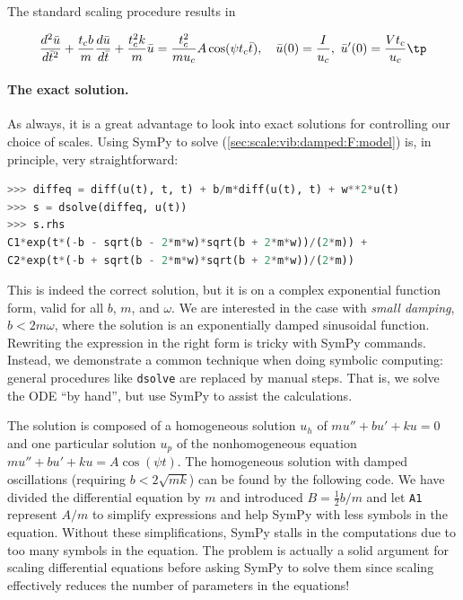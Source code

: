 \documentclass[graybox,envcountchap,sectrefs,final]{svmonodo}
\begin{document}
The standard scaling procedure results in

\begin{equation}
\frac{d^2\bar u}{d\bar t^2} + \frac{t_c b}{m}\frac{d\bar u}{d\bar t}
+ \frac{t_c^2 k}{m}\bar u =
\frac{t_c^2}{mu_c}A\cos(\psi t_c\bar t),
\quad \bar u(0)=\frac{I}{u_c},\ \bar u'(0)=\frac{Vt_c}{u_c}\tp
\label{sec:scale:vib:damped:F:model:scaled0}
\end{equation}

\paragraph{The exact solution.}
As always, it is
a great advantage to look into exact solutions for controlling our
choice of scales.
Using SymPy to solve (\ref{sec:scale:vib:damped:F:model}) is, in principle,
very straightforward:

\begin{lstlisting}[language=Python,style=graycolor]
>>> diffeq = diff(u(t), t, t) + b/m*diff(u(t), t) + w**2*u(t)
>>> s = dsolve(diffeq, u(t))
>>> s.rhs
C1*exp(t*(-b - sqrt(b - 2*m*w)*sqrt(b + 2*m*w))/(2*m)) +
C2*exp(t*(-b + sqrt(b - 2*m*w)*sqrt(b + 2*m*w))/(2*m))
\end{lstlisting}
This is indeed the correct solution, but it is on a complex
exponential function form, valid for all $b$, $m$, and $\omega$. We are
interested in the case with \emph{small damping}, $b < 2m\omega$, where the solution
is an exponentially damped sinusoidal function. Rewriting the expression
in the right form is tricky with SymPy commands. Instead, we demonstrate
a common technique when doing symbolic computing: general procedures like
\texttt{dsolve} are replaced by manual steps. That is, we solve the ODE ``by hand'',
but use SymPy to assist the calculations.

The solution is composed of a homogeneous
solution $u_h$ of $mu'' + bu' + ku=0$ and one particular solution $u_p$
of the nonhomogeneous equation
$mu'' + bu' + ku=A\cos(\psi t)$. The homogeneous solution with
damped oscillations (requiring $b < 2\sqrt{mk}$) can be
found by the following code. We have divided the differential equation
by $m$ and introduced $B=\frac{1}{2}b/m$ and let \texttt{A1} represent
$A/m$ to simplify expressions and
help SymPy with less symbols in the equation. Without these simplifications,
SymPy stalls in the computations due to too many symbols in the equation.
The problem is actually a solid argument for scaling differential equations
before asking SymPy to solve them since scaling effectively reduces the
number of parameters in the equations!
\end{document}
